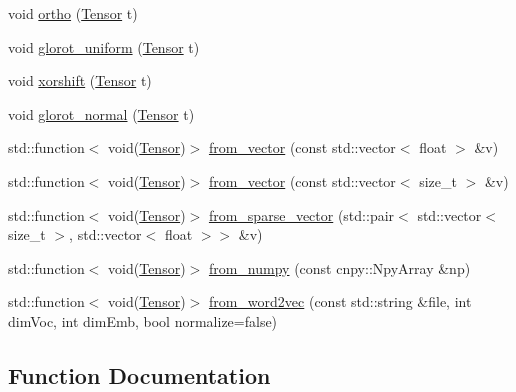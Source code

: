 \begin{DoxyCompactItemize}
\item 
void \hyperlink{namespacemarian_1_1inits_a808daef275cdf015fae319efe2a5b6e1}{ortho} (\hyperlink{namespacemarian_a88b71ec34bb354564cddc24eb80f7e14}{Tensor} t)
\item 
void \hyperlink{namespacemarian_1_1inits_a8838c47537f434b855491cd3ed97ccd1}{glorot\+\_\+uniform} (\hyperlink{namespacemarian_a88b71ec34bb354564cddc24eb80f7e14}{Tensor} t)
\item 
void \hyperlink{namespacemarian_1_1inits_a8b5e30d897124066180a5d55ce811ee0}{xorshift} (\hyperlink{namespacemarian_a88b71ec34bb354564cddc24eb80f7e14}{Tensor} t)
\item 
void \hyperlink{namespacemarian_1_1inits_aa41bfdd6abbcc4567bad71f7a76b50da}{glorot\+\_\+normal} (\hyperlink{namespacemarian_a88b71ec34bb354564cddc24eb80f7e14}{Tensor} t)
\item 
std\+::function$<$ void(\hyperlink{namespacemarian_a88b71ec34bb354564cddc24eb80f7e14}{Tensor})$>$ \hyperlink{namespacemarian_1_1inits_ab9566318ddbacd376c74cdbdfac091e4}{from\+\_\+vector} (const std\+::vector$<$ float $>$ \&v)
\item 
std\+::function$<$ void(\hyperlink{namespacemarian_a88b71ec34bb354564cddc24eb80f7e14}{Tensor})$>$ \hyperlink{namespacemarian_1_1inits_af5f6f0108b5161e1596151ded5953a71}{from\+\_\+vector} (const std\+::vector$<$ size\+\_\+t $>$ \&v)
\item 
std\+::function$<$ void(\hyperlink{namespacemarian_a88b71ec34bb354564cddc24eb80f7e14}{Tensor})$>$ \hyperlink{namespacemarian_1_1inits_aa01b0ccf77ec55218396670f8c49e191}{from\+\_\+sparse\+\_\+vector} (std\+::pair$<$ std\+::vector$<$ size\+\_\+t $>$, std\+::vector$<$ float $>$$>$ \&v)
\item 
std\+::function$<$ void(\hyperlink{namespacemarian_a88b71ec34bb354564cddc24eb80f7e14}{Tensor})$>$ \hyperlink{namespacemarian_1_1inits_a466e51fe497018f864f0fb9c0dd05200}{from\+\_\+numpy} (const cnpy\+::\+Npy\+Array \&np)
\item 
std\+::function$<$ void(\hyperlink{namespacemarian_a88b71ec34bb354564cddc24eb80f7e14}{Tensor})$>$ \hyperlink{namespacemarian_1_1inits_a26fad07f2ceb3649cf0d5da09c03b756}{from\+\_\+word2vec} (const std\+::string \&file, int dim\+Voc, int dim\+Emb, bool normalize=false)
\end{DoxyCompactItemize}


\subsection{Function Documentation}
